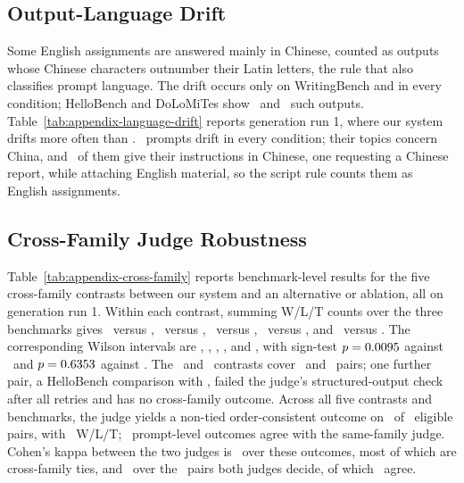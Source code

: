 \subsection{Output-Language Drift}
\label{app:language-drift}
Some English assignments are answered mainly in Chinese, counted as outputs whose Chinese characters outnumber their Latin letters, the rule that also classifies prompt language.
The drift occurs only on WritingBench and in every condition; HelloBench and DoLoMiTes show \HelloDriftTotal\ and \DoLoDriftTotal\ such outputs.
Table~\ref{tab:appendix-language-drift} reports generation run 1, where our system drifts more often than \condStaged.
\DriftEveryConditionPrompts\ prompts drift in every condition; their topics concern China, and \DriftEveryConditionHanPrompts\ of them give their instructions in Chinese, one requesting a Chinese report, while attaching English material, so the script rule counts them as English assignments.


\subsection{Cross-Family Judge Robustness}
\label{app:cross-family}
Table~\ref{tab:appendix-cross-family} reports benchmark-level results for the five cross-family contrasts between our system and an alternative or ablation, all on generation run 1.
Within each contrast, summing W/L/T counts over the three benchmarks gives \CrossFamilyFullSinglePassWLT\ versus \condSinglePass, \CrossFamilyFullStagedWLT\ versus \condStaged, \CrossFamilyFullTaskPlanningWLT\ versus \condTaskPlanning, \CrossFamilyFullNoGoalsWLT\ versus \condNoGoals, and \CrossFamilyFullFixedOrderWLT\ versus \condFixedOrder.
The corresponding Wilson intervals are \CrossFamilyFullSinglePassInterval, \CrossFamilyFullStagedInterval, \CrossFamilyFullTaskPlanningInterval, \CrossFamilyFullNoGoalsInterval, and \CrossFamilyFullFixedOrderInterval, with sign-test $p=0.0095$ against \condStaged\ and $p=0.6353$ against \condFixedOrder.
The \condStaged\ and \condFixedOrder\ contrasts cover \CrossFamilyFullStagedN\ and \CrossFamilyFullFixedOrderN\ pairs; one further pair, a HelloBench comparison with \condStaged, failed the judge's structured-output check after all retries and has no cross-family outcome.
Across all five contrasts and benchmarks, the judge yields a non-tied order-consistent outcome on \CrossFamilyPooledCommitRate\ of \CrossFamilyPooledN\ eligible pairs, with \CrossFamilyPooledWLT\ W/L/T; \CrossFamilyPooledAgreement\ prompt-level outcomes agree with the same-family judge.
Cohen's kappa between the two judges is \JudgeAgreementKappa\ over these outcomes, most of which are cross-family ties, and \JudgeAgreementDecidedKappa\ over the \JudgeAgreementDecidedPairs\ pairs both judges decide, of which \JudgeAgreementDecidedAgreeing\ agree.


